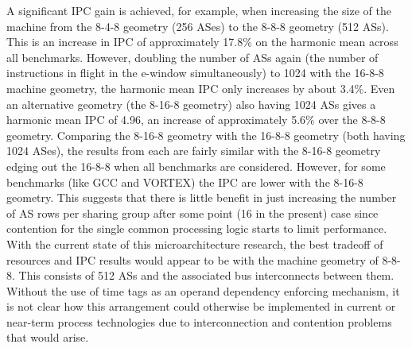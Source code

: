 \documentclass[10pt,dvips]{article}
\begin{document}
A significant IPC gain is achieved, for example, when increasing the
size of the machine from the 8-4-8 geometry (256 ASes) to the 8-8-8 geometry
(512 ASs).  This is an increase in IPC of approximately 17.8\% on the
harmonic mean across all benchmarks.  However, doubling the number
of ASs again (the number of instructions in flight
in the e-window simultaneously) to 1024 with the 16-8-8 machine geometry,
the harmonic mean IPC only increases by about 3.4\%.  Even an
alternative geometry (the 8-16-8 geometry) also having 1024 ASs
gives a harmonic mean IPC of 4.96, an increase of approximately 5.6\%
over the 8-8-8 geometry.
Comparing the 8-16-8 geometry with the 16-8-8 geometry (both having
1024 ASes), the results from each are fairly similar with the
8-16-8 geometry edging out the 16-8-8 when all benchmarks are
considered.  However, for some benchmarks (like GCC and VORTEX)
the IPC are lower with the 8-16-8 geometry.  This suggests that
there is little benefit in just increasing the number of AS
rows per sharing group after some point (16 in the present) case
since contention for the single common processing logic starts
to limit performance.
With the current state of this microarchitecture research,
the best tradeoff of resources and IPC results would appear
to be with the machine geometry of 8-8-8.  This consists of 512
ASs and the associated bus interconnects between them. 
Without the use of time tags as an operand dependency enforcing
mechanism, it is not clear how this arrangement could otherwise be 
implemented
in current or near-term process technologies due to interconnection
and contention problems that would arise.
\end{document}
